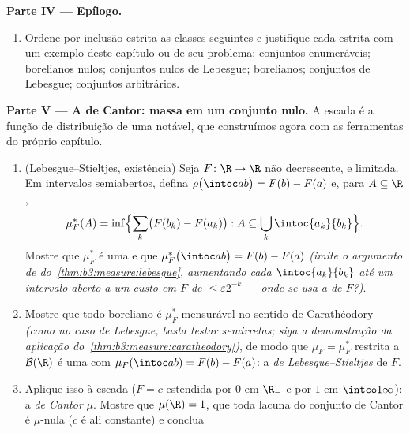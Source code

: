 \begin{problem}
\medskip
\noindent\textbf{Parte IV --- Epílogo.}
\begin{enumerate}[resume]
  \item Ordene por inclusão estrita as classes seguintes e justifique
        cada estrita com um exemplo deste capítulo ou de seu problema:
        conjuntos enumeráveis; borelianos nulos; conjuntos nulos de
        Lebesgue; borelianos; conjuntos de Lebesgue; conjuntos
        arbitrários.
\end{enumerate}

\medskip
\noindent\textbf{Parte V --- A  de Cantor: massa em um conjunto
nulo.} A escada é a função de distribuição de uma  notável, que
construímos agora com as ferramentas do próprio capítulo.
\begin{enumerate}[resume]
  \item (Lebesgue--Stieltjes, existência) Seja $F\colon\R\to\R$ não decrescente,
         e limitada. Em intervalos semiabertos, defina $\rho\bigl(\intoc ab\bigr) = F(b) -
        F(a)$ e,
        para $A \subseteq \R$,
        \[
        \mu_F^*(A) = \inf\Bigl\{\sum_k\bigl(F(b_k) -
        F(a_k)\bigr) : A \subseteq
        \bigcup_k\intoc{a_k}{b_k}\Bigr\} .
        \]
        Mostre que $\mu_F^*$ é uma  e que $\mu_F^*\bigl(\intoc ab\bigr) = F(b) - F(a)$ \emph{(imite
        o argumento de  do~\cref{thm:b3:measure:lebesgue}, aumentando cada
        $\intoc{a_k}{b_k}$ até um intervalo aberto a um custo em $F$ de $\leq \varepsilon2^{-k}$ ---
        onde se usa a  de $F$?)}.
  \item Mostre que todo boreliano é $\mu_F^*$-mensurável no sentido de
        Carathéodory \emph{(como no caso de Lebesgue, basta testar
        semirretas; siga a demonstração da aplicação
        do~\cref{thm:b3:measure:caratheodory})}, de modo que $\mu_F = \mu_F^*$ restrita a $\mathcal B(\R)$ é uma
         com $\mu_F(\intoc ab) = F(b) - F(a)$: a \emph{ de Lebesgue--Stieltjes} de
        $F$.
  \item Aplique isso à escada ($F = c$ estendida por $0$ em
        $\R_-$ e por $1$ em $\intco1\infty$): a \emph{ de Cantor}
        $\mu$. Mostre que $\mu(\R) = 1$, que toda lacuna do conjunto de
        Cantor é $\mu$-nula ($c$ é ali constante) e conclua

\end{enumerate}
\end{problem}
